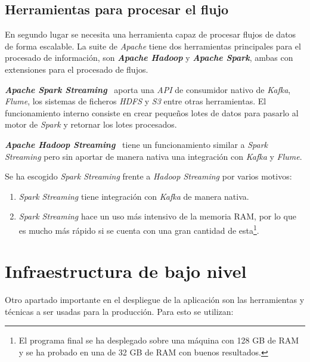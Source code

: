 \subsection{Herramientas para procesar el flujo}
En segundo lugar se necesita una herramienta capaz de procesar flujos de datos de forma escalable. La suite de \textit{Apache} tiene dos herramientas principales para el procesado de información, son \textit{\textbf{Apache Hadoop}} y \textit{\textbf{Apache Spark}}, ambas con extensiones para el procesado de flujos.

\textit{\textbf{Apache Spark Streaming}}~\cite{noauthorsparknodate} aporta una \textit{API} de consumidor nativo de \textit{Kafka}, \textit{Flume}, los sistemas de ficheros \textit{HDFS} y \textit{S3} entre otras herramientas. El funcionamiento interno consiste en crear pequeños lotes de datos para pasarlo al motor de \textit{Spark} y retornar los lotes procesados.

\textit{\textbf{Apache Hadoop Streaming}}~\cite{noauthorhadoop} tiene un funcionamiento similar a \textit{Spark Streaming} pero sin aportar de manera nativa una integración con \textit{Kafka} y \textit{Flume}.

Se ha escogido \textit{Spark Streaming} frente a \textit{Hadoop Streaming} por varios motivos:
\begin{enumerate}
	\item \textit{Spark Streaming} tiene integración con \textit{Kafka} de manera nativa.
	\item \textit{Spark Streaming} hace un uso más intensivo de la memoria RAM, por lo que es mucho más rápido si se cuenta con una gran cantidad de esta\footnote{El programa final se ha desplegado sobre una máquina con 128 GB de RAM y se ha probado en una de 32 GB de RAM con buenos resultados.}.
\end{enumerate}


\section{Infraestructura de bajo nivel}

Otro apartado importante en el despliegue de la aplicación son las herramientas y técnicas a ser usadas para la producción. Para esto se utilizan:

